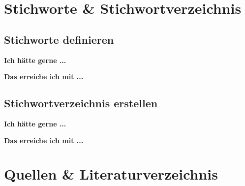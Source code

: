 \documentclass[twoside, 
               a4paper, 
               10pt, 
               parskip=full, 
               sectionentrydots=true, 
               listof=totoc, 
               listof=entryprefix,
               numbers=endperiod]{scrartcl}
\begin{document}
\section{Stichworte \& Stichwortverzeichnis}
\subsection{Stichworte definieren}

{\textbf {Ich hätte gerne ...}}
 
\begin{miniSeite}[colbacktitle=black!35!white,title=Ausdruck]

\end{miniSeite}


\newpage
{\textbf {Das erreiche ich mit ...}}
 
\begin{miniSeite}[colbacktitle=black!35!white,title=\LaTeX-Code]

\end{miniSeite}




\newpage
\subsection{Stichwortverzeichnis erstellen}
{\textbf {Ich hätte gerne ...}}
 
\begin{miniSeite}[colbacktitle=black!35!white,title=Ausdruck]

\end{miniSeite}


\newpage
{\textbf {Das erreiche ich mit ...}}
 
\begin{miniSeite}[colbacktitle=black!35!white,title=\LaTeX-Code]

\end{miniSeite}





\newpage
\section{Quellen \& Literaturverzeichnis}
\end{document}
